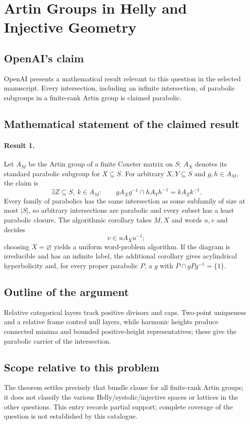 \documentclass[11pt]{article}
\begin{document}
\section*{Artin Groups in Helly and Injective Geometry}

\subsection{OpenAI's claim}
OpenAI presents a mathematical result relevant to this question in the selected manuscript. Every intersection, including an infinite intersection, of parabolic subgroups in a finite-rank Artin group is claimed parabolic.

\subsection{Mathematical statement of the claimed result}
\paragraph{Result 1.} Let \(A_M\) be the Artin group of a finite Coxeter matrix on \(S\); \(A_X\) denotes its standard parabolic subgroup for \(X\subseteq S\). For arbitrary \(X,Y\subseteq S\) and \(g,h\in A_M\), the claim is
\[
 \exists Z\subseteq S,\ k\in A_M:\qquad
 gA_Xg^{-1}\cap hA_Yh^{-1}=kA_Zk^{-1}.
\]
Every family of parabolics has the same intersection as some subfamily of size at most \(|S|\), so arbitrary intersections are parabolic and every subset has a least parabolic closure. The algorithmic corollary takes \(M,X\) and words \(u,v\) and decides
\[
 v\in uA_Xu^{-1};
\]
choosing \(X=\varnothing\) yields a uniform word-problem algorithm. If the diagram is irreducible and has an infinite label, the additional corollary gives acylindrical hyperbolicity and, for every proper parabolic \(P\), a \(g\) with \(P\cap gPg^{-1}=\{1\}\).

\subsection{Outline of the argument}
Relative categorical layers track positive divisors and caps. Two-point uniqueness and a relative frame control null layers, while harmonic heights produce connected minima and bounded positive-height representatives; these give the parabolic carrier of the intersection.

\subsection{Scope relative to this problem}
The theorem settles precisely that bundle clause for all finite-rank Artin groups; it does not classify the various Helly/systolic/injective spaces or lattices in the other questions. This entry records partial support; complete coverage of the question is not established by this catalogue.
\end{document}
